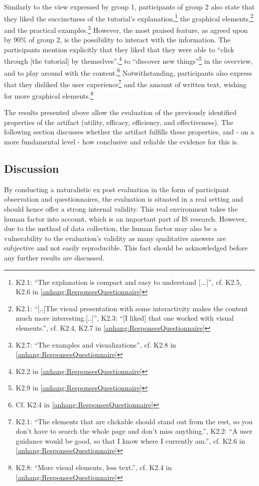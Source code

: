 Similarly to the view expressed by group 1, participants of group 2 also state that they liked the succinctness of the tutorial's explanation,\footnote{K2.1: \enquote{The explanation is compact and easy to understand [...]}, cf. K2.5, K2.6 in \ref{anhang:ResponsesQuestionnaire}} the graphical elements,\footnote{K2.1: \enquote{[..]The visual presentation with some interactivity makes the content much more interesting.[..]}, K2.3: \enquote{[I liked] that one worked with visual elements.}, cf. K2.4, K2.7 in \ref{anhang:ResponsesQuestionnaire}} and the practical examples.\footnote{K2.7: \enquote{The examples and visualizations}, cf. K2.8 in \ref{anhang:ResponsesQuestionnaire}} However, the most praised feature, as agreed upon by 90\% of group 2, is the possibility to interact with the information. The participants mention explicitly that they liked that they were able to \enquote{click through [the tutorial] by themselves},\footnote{K2.2 in \ref{anhang:ResponsesQuestionnaire}} to \enquote{discover new things}\footnote{K2.9 in \ref{anhang:ResponsesQuestionnaire}} in the overview, and to play around with the content.\footnote{Cf. K2.4 in \ref{anhang:ResponsesQuestionnaire}} Notwithstanding, participants also express that they disliked the user experience\footnote{K2.1: \enquote{The elements that are clickable should stand out from the rest, so you don't have to search the whole page and don't miss anything.}, K2.2: \enquote{A user guidance would be good, so that I know where I currently am.}, cf. K2.6 in \ref{anhang:ResponsesQuestionnaire}} and the amount of written text, wishing for more graphical elements.\footnote{K2.8: \enquote{More visual elements, less text.}, cf. K2.4 in \ref{anhang:ResponsesQuestionnaire}}

The results presented above allow the evaluation of the previously identified properties of the artifact (utility, efficacy, efficiency, and effectiveness). The following section discusses whether the artifact fulfills these properties, and - on a more fundamental level - how conclusive and reliable the evidence for this is. 

\subsection{Discussion}
By conducting a naturalistic ex post  evaluation in the form of participant observation and questionnaires, the evaluation is situated in a real setting and should hence offer a strong internal validity. This real environment takes the human factor into account, which is an important part of \ac{IS} research. However, due to the method of data collection, the human factor may also be a vulnerability to the evaluation's validity as many qualitative answers are subjective and not easily reproducible. This fact should be acknowledged before any further results are discussed.

